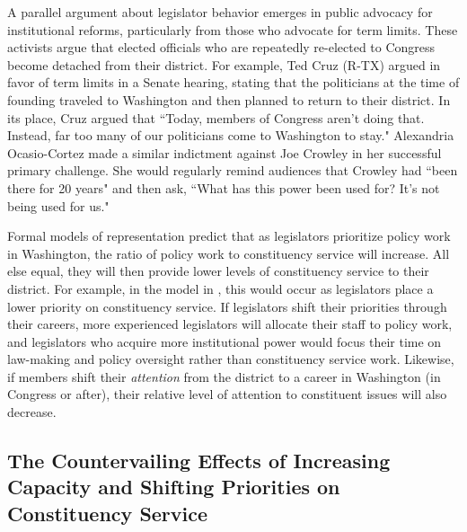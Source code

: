 \documentclass[12pt]{article}
\begin{document}
A parallel argument about legislator behavior emerges in public advocacy for institutional reforms, particularly from those who advocate for term limits. These activists argue that elected officials who are repeatedly re-elected to Congress become detached from their district. For example, Ted Cruz (R-TX) argued in favor of term limits in a Senate hearing, stating that the politicians at the time of founding traveled to Washington and then planned to return to their district. In its place, Cruz argued that ``Today, members of Congress aren't doing that. Instead, far too many of our politicians come to Washington to stay." Alexandria Ocasio-Cortez made a similar indictment against Joe Crowley in her successful primary challenge. She would regularly remind audiences that Crowley had ``been there for 20 years" and then ask, ``What has this power been used for? It's not being used for us." %

Formal models of representation predict that as legislators prioritize policy work in Washington, the ratio of policy work to constituency service will increase. All else equal, they will then provide lower levels of constituency service to their district. For example, in the model in \cite{AshworthBuenodeMesquita2006}, this would occur as legislators place a lower priority on constituency service. If legislators shift their priorities through their careers, more experienced legislators will allocate their staff to policy work, and legislators who acquire more institutional power would focus their time on law-making and policy oversight rather than constituency service work. Likewise, if members shift their \textit{attention} from the district to a career in Washington (in Congress or after), their relative level of attention to constituent issues will also decrease. 


\subsection{The Countervailing Effects of Increasing Capacity and Shifting Priorities on Constituency Service}
\end{document}
